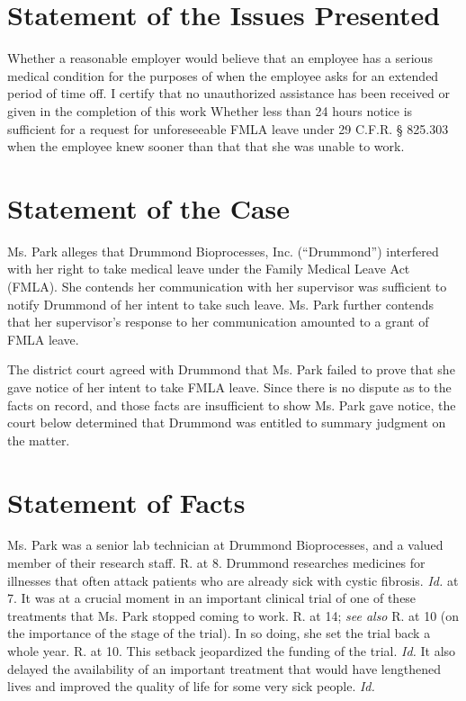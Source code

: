 
\def\mytitle{Appellate Brief}
\def\myauthor{Matt Henry}
\def\bibliocommand{}
\def\bibliostyle{apacite}

\def\latexmode{memoir}

\part{Statement of the Issues Presented}
\label{statementoftheissuespresented}

Whether a reasonable employer would believe that an employee has a serious medical condition for the purposes of  \citet{29-cfr-825-303} when the employee asks for an extended period of time off.
I certify that no unauthorized assistance has been received or given in the completion of this work
Whether less than 24 hours notice is sufficient for a request for unforeseeable FMLA leave under 29 C.F.R. § 825.303 when the employee knew sooner than that that she was unable to work.

\part{Statement of the Case}
\label{statementofthecase}

Ms. Park alleges that Drummond Bioprocesses, Inc. (``Drummond'') interfered with her right to take medical leave under the Family Medical Leave Act (FMLA). She contends her communication with her supervisor was sufficient to notify Drummond of her intent to take such leave. Ms. Park further contends that her supervisor's response to her communication amounted to a grant of FMLA leave.

The district court agreed with Drummond that Ms. Park failed to prove that she gave notice of her intent to take FMLA leave. Since there is no dispute as to the facts on record, and those facts are insufficient to show Ms. Park gave notice, the court below determined that Drummond was entitled to summary judgment on the matter.

\part{Statement of Facts}
\label{statementoffacts}

Ms. Park was a senior lab technician at Drummond Bioprocesses, and a valued member of their research staff. R. at 8. Drummond researches medicines for illnesses that often attack patients who are already sick with cystic fibrosis. \emph{Id.} at 7. It was at a crucial moment in an important clinical trial of one of these treatments that Ms. Park stopped coming to work. R. at 14; \emph{see also} R. at 10 (on the importance of the stage of the trial). In so doing, she set the trial back a whole year. R. at 10. This setback jeopardized the funding of the trial. \emph{Id.} It also delayed the availability of an important treatment that would have lengthened lives and improved the quality of life for some very sick people. \emph{Id.}

